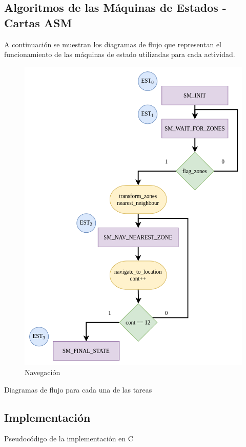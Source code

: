 \subsection{Algoritmos de las Máquinas de Estados - Cartas ASM}
A continuación se muestran los diagramas de flujo que representan el funcionamiento de las máquinas de estado utilizadas para cada actividad.

\begin{figure}[Ht]
    \centering
    \includegraphics[scale= 0.4]{Figures/Navigation_CT.png}
        \caption{Navegación}
        \label{fig:ASM_Navigation}
    \end{figure}
Diagramas de flujo para cada una de las tareas

\subsection{Implementación}
Pseudocódigo de la implementación en C